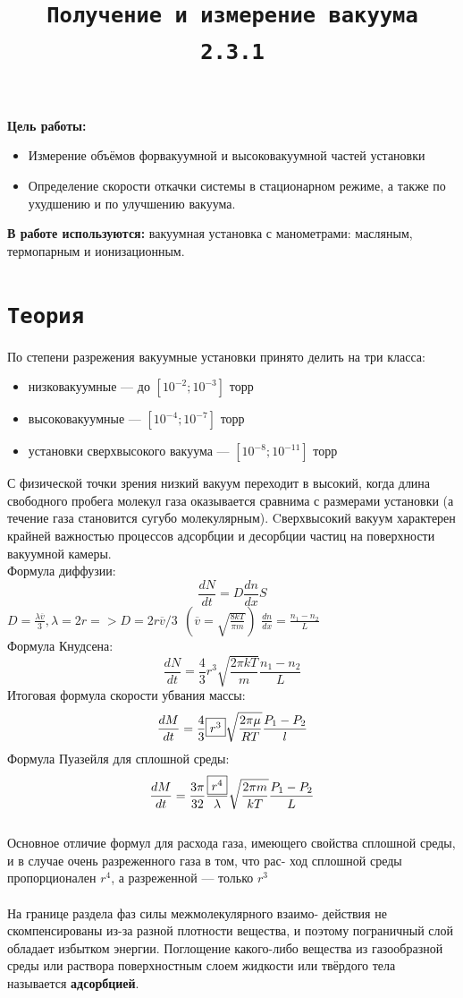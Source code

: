 \documentclass[11pt,a4paper]{article}
\title{\texttt{Получение и измерение вакуума \\ 2.3.1}}
\author{}
\date{}
\begin{document}
\maketitle

\textbf{Цель работы:}
\begin{itemize}
  \item Измерение объёмов форвакуумной и высоковакуумной частей установки
  \item  Определение скорости откачки системы в
        стационарном режиме, а также по ухудшению и по улучшению вакуума.
\end{itemize}

\textbf{В работе используются:} вакуумная установка с манометрами: масляным, термопарным и ионизационным.

\section*{\texttt{Теория}}
По степени разрежения вакуумные установки принято делить на
три класса: \begin{itemize}
  \item низковакуумные — до  $[10^{-2}; 10^{-3}]$ торр
  \item высоковакуумные — $[10^{-4}; 10^{-7}]$ торр
  \item установки сверхвысокого вакуума — $[10^{-8};10^{-11}]$ торр
\end{itemize}
С физической точки зрения низкий вакуум переходит в высокий, когда длина свободного
пробега молекул газа оказывается сравнима с
размерами установки (а течение газа становится сугубо молекулярным).
Cверхвысокий вакуум характерен крайней важностью
процессов адсорбции и десорбции частиц на поверхности вакуумной камеры.
\\ Формула диффузии:
\[\frac{dN}{dt} = D\frac{dn}{dx}S\]
$D = \frac{\lambda \overline v}{3}, \lambda = 2r => D = 2r\overline v / 3\ \  (\overline v = \sqrt{\frac{8kT}{\pi m}})$
$\frac{dn}{dx} = \frac{n_1 - n_2}{L}$
\\ Формула Кнудсена:
\[\frac{dN}{dt} = \frac{4}{3}r^3\sqrt{\frac{2\pi kT}{m}}\frac{n_1 - n_2}{L}\]
Итоговая формула скорости убвания массы:
\[\frac{dM}{dt} = \frac{4}{3}\fbox{$r^3$}\sqrt{\frac{2\pi \mu}{RT}}\frac{P_1-P_2}{l}\]
Формула Пуазейля для сплошной среды:
\[\frac{dM}{dt} = \frac{3\pi}{32}\frac{\fbox{$r^4$}}{\lambda}\sqrt{\frac{2\pi m}{kT}}\frac{P_1 - P_2}{L}\]
\\
Основное отличие формул для расхода газа, имеющего свойства
сплошной среды, и в случае очень разреженного газа в том, что рас-
ход сплошной среды пропорционален $r^4$, а разреженной — только
$r^3$\\
\\
На границе раздела фаз силы межмолекулярного взаимо-
действия не скомпенсированы из-за разной плотности вещества, и
поэтому пограничный слой обладает избытком энергии. Поглощение какого-либо
вещества из газообразной среды или раствора поверхностным слоем
жидкости или твёрдого тела называется \textbf{адсорбцией}.
\end{document}

